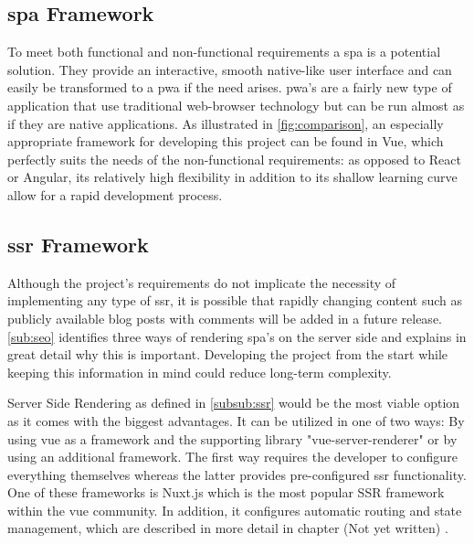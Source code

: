 \subsection{\acrshort{spa} Framework}
To meet both functional and non-functional requirements a \acrfull{spa} is a potential solution. They provide an interactive, smooth native-like user interface and can easily be transformed to a \acrfull{pwa} if the need arises. \acrshort{pwa}'s are a fairly new type of application that use traditional web-browser technology but can be run almost as if they are native applications. As illustrated in \autoref{fig:comparison}, an especially appropriate framework for developing this project can be found in Vue, which perfectly suits the needs of the non-functional requirements: as opposed to React or Angular, its relatively high flexibility in addition to its shallow learning curve allow for a rapid development process.

\subsection{\acrshort{ssr} Framework}
Although the project's requirements do not implicate the necessity of implementing any type of \acrfull{ssr}, it is possible that rapidly changing content such as publicly available blog posts with comments will be added in a future release. \autoref{sub:seo} identifies three ways of rendering \acrshort{spa}'s on the server side and explains in great detail why this is important. Developing the project from the start while keeping this information in mind could reduce long-term complexity. 

Server Side Rendering as defined in \autoref{subsub:ssr} would be the most viable option as it comes with the biggest advantages. It can be utilized in one of two ways: By using vue as a framework and the supporting library "vue-server-renderer" or by using an additional framework. The first way requires the developer to configure everything themselves whereas the latter provides pre-configured \acrshort{ssr} functionality. One of these frameworks is Nuxt.js which is the most  popular SSR framework within the vue community. In addition, it configures automatic routing and state management, which are described in more detail in chapter (Not yet written) . 

